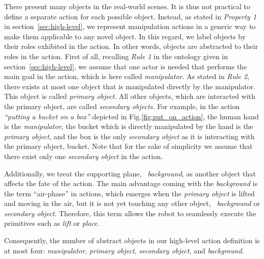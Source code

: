 There present many  objects in the real-world scenes.
It is thus not practical to define a separate action for each possible object.
Instead, as stated in {\it Property 1}  in section~\ref{sec:high-level}, we represent manipulation actions in a generic way to make them applicable to any novel object.
In this regard, we label objects by their roles exhibited in the action. In other words, objects are abstracted to their roles in the action.
First of all, recalling {\it Rule 1} in the ontology given in section~\ref{sec:high-level}, we assume that one actor is needed that performs the main goal in the action, which is here called \textit{manipulator}. As stated in {\it Rule 2}, there exists at most one object that is manipulated directly by the manipulator.
This object is called \textit{primary object}. All other objects, which are interacted with the primary object, are called {\it secondary objects}.
For example, in the action {\it ``putting a bucket on a box''}  depicted in Fig.\ref{fig:put_on_action}, the human hand is the \textit{manipulator}, the bucket which is directly manipulated by the hand is the \textit{primary object}, and the box is the only {\it secondary object} as it is interacting with the primary object, \ie bucket.
Note that for the sake of simplicity we assume that there exist only one {\it secondary object} in the action. 

Additionally, we treat the supporting plane, \ie~{\it background}, as another object that affects the fate of the action. The main advantage coming with the {\it background} is the term ``air-phase'' in actions, 
which emerges when the \textit{primary object} is lifted and moving in the air, but it is not yet touching any other object, \eg~{\it background} or \textit{secondary object}. Therefore, this term allows the robot to seamlessly execute the primitives such as {\it lift} or {\it place}.

Consequently, the number of abstract objects in our high-level action definition is at most four: \textit{manipulator}, \textit{primary object}, \textit{secondary object}, and {\it background}.
 



